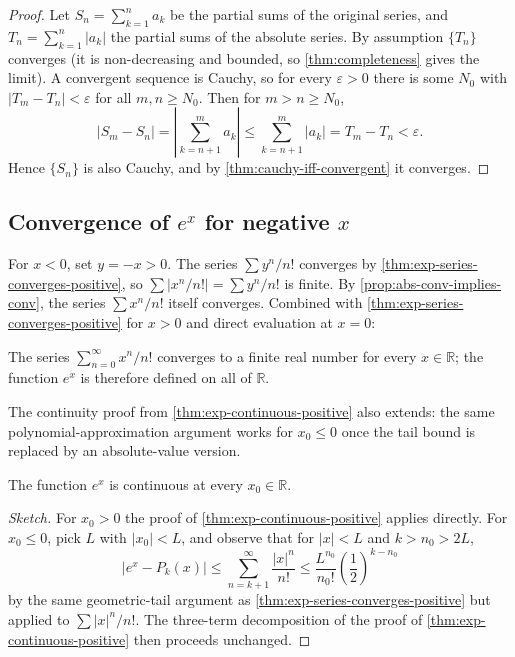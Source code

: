 \begin{proof}
Let \(S_{n} = \sum_{k = 1}^{n} a_{k}\) be the partial sums of the original series, and \(T_{n} = \sum_{k = 1}^{n} \lvert a_{k} \rvert\) the partial sums of the absolute series. By assumption \(\{T_{n}\}\) converges (it is non-decreasing and bounded, so \cref{thm:completeness} gives the limit). A convergent sequence is Cauchy, so for every \(\varepsilon > 0\) there is some \(N_{0}\) with \(\lvert T_{m} - T_{n} \rvert < \varepsilon\) for all \(m, n \geq N_{0}\). Then for \(m > n \geq N_{0}\),
\[
\lvert S_{m} - S_{n} \rvert
= \left\lvert \sum_{k = n + 1}^{m} a_{k} \right\rvert
\leq \sum_{k = n + 1}^{m} \lvert a_{k} \rvert
= T_{m} - T_{n}
< \varepsilon.
\]
Hence \(\{S_{n}\}\) is also Cauchy, and by \cref{thm:cauchy-iff-convergent} it converges.
\end{proof}

\subsection{Convergence of \texorpdfstring{$e^{x}$}{e\^{}x} for negative \texorpdfstring{$x$}{x}}

For \(x < 0\), set \(y = -x > 0\). The series \(\sum y^{n}/n!\) converges by \cref{thm:exp-series-converges-positive}, so \(\sum \lvert x^{n}/n! \rvert = \sum y^{n}/n!\) is finite. By \cref{prop:abs-conv-implies-conv}, the series \(\sum x^{n}/n!\) itself converges. Combined with \cref{thm:exp-series-converges-positive} for \(x > 0\) and direct evaluation at \(x = 0\):

\begin{corollary}\label{cor:exp-defined-on-R}
The series \(\sum_{n = 0}^{\infty} x^{n}/n!\) converges to a finite real number for every \(x \in \mathbb{R}\); the function \(e^{x}\) is therefore defined on all of \(\mathbb{R}\).
\end{corollary}

The continuity proof from \cref{thm:exp-continuous-positive} also extends: the same polynomial-approximation argument works for \(x_{0} \leq 0\) once the tail bound is replaced by an absolute-value version.

\begin{theorem}\label{thm:exp-continuous}
The function \(e^{x}\) is continuous at every \(x_{0} \in \mathbb{R}\).
\end{theorem}

\begin{proof}[Sketch]
For \(x_{0} > 0\) the proof of \cref{thm:exp-continuous-positive} applies directly. For \(x_{0} \leq 0\), pick \(L\) with \(\lvert x_{0} \rvert < L\), and observe that for \(\lvert x \rvert < L\) and \(k > n_{0} > 2L\),
\[
\left\lvert e^{x} - P_{k}(x) \right\rvert \leq \sum_{n = k + 1}^{\infty} \frac{\lvert x \rvert^{n}}{n!} \leq \frac{L^{n_{0}}}{n_{0}!} \left(\frac{1}{2}\right)^{k - n_{0}}
\]
by the same geometric-tail argument as \cref{thm:exp-series-converges-positive} but applied to \(\sum \lvert x \rvert^{n}/n!\). The three-term decomposition of the proof of \cref{thm:exp-continuous-positive} then proceeds unchanged.
\end{proof}

